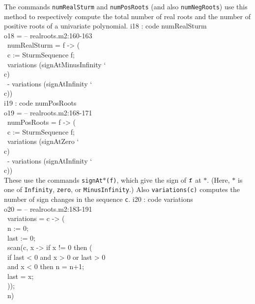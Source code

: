 The \Mtwo{}\/ commands  {\tt numRealSturm} and 
{\tt numPosRoots} (and also {\tt numNegRoots}) use this method to respectively
compute the total number of real roots and the number of positive roots of 
a univariate polynomial. 
%
\beginOutput
i18 : code numRealSturm\\
\emptyLine
o18 = -- realroots.m2:160-163\\
\      numRealSturm = f -> (\\
\           c := SturmSequence f;\\
\           variations (signAtMinusInfinity {\char`\\} c) \\
\               - variations (signAtInfinity {\char`\\} c))\\
\endOutput
%
\beginOutput
i19 : code numPosRoots\\
\emptyLine
o19 = -- realroots.m2:168-171\\
\      numPosRoots = f -> (  \\
\           c := SturmSequence f;\\
\           variations (signAtZero {\char`\\} c) \\
\               - variations (signAtInfinity {\char`\\} c))\\
\endOutput
%
These use the commands {\tt signAt}$*${\tt (f)}, which 
give the sign of ${\tt f}$
at $*$.
(Here, $*$ is one of  {\tt Infinity}, {\tt zero}, or {\tt MinusInfinity}.)
Also {\tt variations(c)} computes the 
number of sign changes in the sequence {\tt c}.
%
\beginOutput
i20 : code variations\\
\emptyLine
o20 = -- realroots.m2:183-191\\
\      variations = c -> (\\
\           n := 0;\\
\           last := 0;\\
\           scan(c, x -> if x != 0 then (\\
\                     if last < 0 and x > 0 or last > 0 \\
\                        and x < 0 then n = n+1;\\
\                     last = x;\\
\                     ));\\
\           n)\\
\endOutput
%


